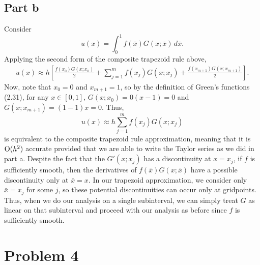 \documentclass{article}
\begin{document}
\subsection{Part b}
Consider 
\[
u(x) = \int_0^1 f( \bar{x} ) G(x; \bar{x} )\,d \bar{x}.
\]
Applying the second form of the composite trapezoid rule above, 
\begin{align*}
u(x)\approx h \left[ \frac{f(x_0)G(x;x_0)}{2} + \sum_{j=1}^m f(x_j)G(x;x_j) + 
                   \frac{f(x_{m+1})G(x;x_{m+1})}{2} \right].
\end{align*}
Now, note that $x_0=0$ and $x_{m+1}=1$, so by the definition of Green's functions (2.31), for any $x\in[0,1]$, $G(x;x_0)=0(x-1)=0$ and $G(x;x_{m+1})=(1-1)x=0$. Thus, 
\[
u(x)\approx h\sum_{j=1}^m f(x_j)G(x;x_j)
\]
is equivalent to the composite trapezoid rule approximation, meaning that it is $\operatorname{O}(h^2)$ accurate provided that we are able to write the Taylor series as we did in part a. Despite the fact that the $G'(x;x_j)$ has a discontinuity at $x=x_j$, if $f$ is sufficiently smooth, then the derivatives of $f( \bar{x} ) G(x; \bar{x} )$ have a possible discontinuity only at $\bar{x}=x$. In our trapezoid approximation, we consider only $\bar{x}=x_j$ for some $j$, so these potential discontinuities can occur only at gridpoints. Thus, when we do our analysis on a single subinterval, we can simply treat $G$ as linear on that subinterval and proceed with our analysis as before since $f$ is sufficiently smooth. 


\section{Problem 4}
\end{document}
